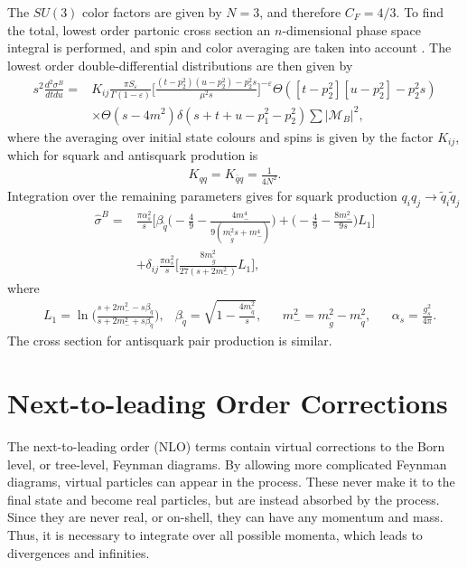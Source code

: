 \documentclass[twoside,english]{uiofysmaster}
\begin{document}
The $SU(3)$ color factors are given by $N=3$, and therefore $C_F = 4/3$. To find the total, lowest order partonic cross section an $n$-dimensional phase space integral is performed, and spin and color averaging are taken into account \cite{beenakker1997squark}. The lowest order double-differential distributions are then given by
\begin{align}
s^2 \frac{d^2 \sigma^B}{dt du} =&  K_{ij} \frac{\pi S_{\varepsilon}}{\Gamma(1 - \varepsilon)} \Bigg[ \frac{(t-p_2^2)(u-p_2^2) - p_2^2s}{\mu^2s} \Bigg]^{- \varepsilon} \Theta ([t-p_2^2][u- p_2^2]-p_2^2s) \nonumber \\
& \times \Theta (s -4m^2) \delta (s+t+u-p_1^2 -p_2^2) \sum |\mathcal{M}_B|^2,
\end{align} 
where the averaging over initial state colours and spins is given by the factor $K_{ij}$, which for squark and antisquark prodution is \cite{beenakker1997squark}
\begin{align}
K_{qq} = K_{\bar{q}q} = \frac{1}{4 N^2}.
\end{align}
Integration over the remaining parameters gives for squark production $q_iq_j \rightarrow \tilde{q}_i \tilde{q}_j$ \cite{beenakker1997squark}
\begin{align}\label{Eq:: susy hadron : Born term sigma}
\hat{\sigma}^B =& \frac{\pi \alpha_s^2}{s} \Bigg[\beta_{\tilde{q}} \Big(-\frac{4}{9} - \frac{4m_-^4}{9(m_{\tilde{g}}^2s+m_-^4)} \Big) + \Big(-\frac{4}{9}- \frac{8m_-^2}{9s} \Big) L_1 \Bigg] \nonumber \\
&+ \delta_{ij} \frac{\pi \alpha_s^2}{s} \Bigg[ \frac{8m_{\tilde{g}}^2}{27(s+2m_-^2)} L_1 \Bigg],
\end{align}
where
\begin{align*}
&L_1 = \ln \Big( \frac{s+2m_-^2-s \beta_{\tilde{q}}}{s+ 2m_-^2+s \beta_{\tilde{q}}} \Big), &\beta_{\tilde{q}} = \sqrt{1-\frac{4m_{\tilde{q}}^2}{s}}, &&m_-^2 = m_{\tilde{g}}^2 - m_{\tilde{q}}^2, &&\alpha_s = \frac{g_s^2}{4 \pi}.
\end{align*}
The cross section for antisquark pair production is similar.

\section{Next-to-leading Order Corrections}

The next-to-leading order (NLO) terms contain virtual corrections to the Born level, or tree-level, Feynman diagrams. By allowing more complicated Feynman diagrams, virtual particles can appear in the process. These never make it to the final state and become real particles, but are instead absorbed by the process. Since they are never real, or on-shell, they can have any momentum and mass. Thus, it is necessary to integrate over all possible momenta, which leads to divergences and infinities. 
\end{document}
